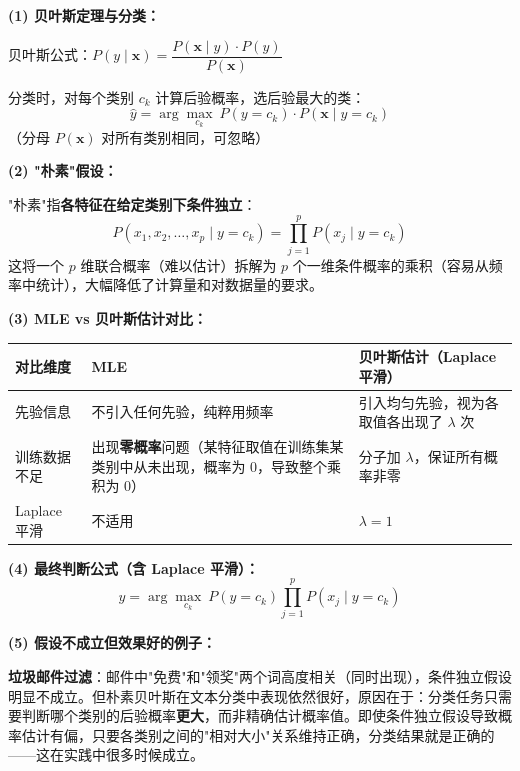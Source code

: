 \documentclass[a4paper,11pt]{ctexart}
\begin{document}
\begin{solutionbox}[参考答案与详细解析]
    \textbf{(1) 贝叶斯定理与分类：}

    贝叶斯公式：$P(y \mid \mathbf{x}) = \dfrac{P(\mathbf{x} \mid y) \cdot P(y)}{P(\mathbf{x})}$

    分类时，对每个类别 $c_k$ 计算后验概率，选后验最大的类：
    \[
    \hat{y} = \arg\max_{c_k}\ P(y = c_k) \cdot P(\mathbf{x} \mid y = c_k)
    \]
    （分母 $P(\mathbf{x})$ 对所有类别相同，可忽略）

    \textbf{(2) "朴素"假设：}

    "朴素"指\textbf{各特征在给定类别下条件独立}：
    \[
    P(x_1, x_2, \ldots, x_p \mid y = c_k) = \prod_{j=1}^{p} P(x_j \mid y = c_k)
    \]
    这将一个 $p$ 维联合概率（难以估计）拆解为 $p$ 个一维条件概率的乘积（容易从频率中统计），大幅降低了计算量和对数据量的要求。

    \textbf{(3) MLE vs 贝叶斯估计对比：}

    \begin{center}
    \begin{tabular}{p{3.5cm} p{4.5cm} p{4.5cm}}
        \toprule
        对比维度 & MLE & 贝叶斯估计（Laplace 平滑） \\
        \midrule
        先验信息 & 不引入任何先验，纯粹用频率 & 引入均匀先验，视为各取值各出现了 $\lambda$ 次 \\[1em]
        训练数据不足 & 出现\textbf{零概率}问题（某特征取值在训练集某类别中从未出现，概率为 0，导致整个乘积为 0） & 分子加 $\lambda$，保证所有概率非零 \\[1em]
        Laplace 平滑 & 不适用 & $\lambda = 1$ \\
        \bottomrule
    \end{tabular}
    \end{center}

    \textbf{(4) 最终判断公式（含 Laplace 平滑）：}
    \[
    \hat{y} = \arg\max_{c_k}\ P(y = c_k) \prod_{j=1}^{p} P(x_j \mid y = c_k)
    \]

    \textbf{(5) 假设不成立但效果好的例子：}

    \textbf{垃圾邮件过滤}：邮件中"免费"和"领奖"两个词高度相关（同时出现），条件独立假设明显不成立。但朴素贝叶斯在文本分类中表现依然很好，原因在于：分类任务只需要判断哪个类别的后验概率\textbf{更大}，而非精确估计概率值。即使条件独立假设导致概率估计有偏，只要各类别之间的"相对大小"关系维持正确，分类结果就是正确的——这在实践中很多时候成立。
\end{solutionbox}
\end{document}
